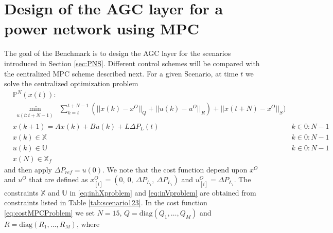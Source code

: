 \documentclass[a4paper]{article}
\newcommand{\subss}[2]{#1_{[#2]}}
\newcommand{\diag}{\mbox{diag}}
\newcommand{\Xset}{\mathbb{X}}
\newcommand{\Uset}{\mathbb{U}}
\newcommand{\norme}[2]{{||{#1}||_{#2}}}
\newcommand{\Pset}{\mathbb{P}}
\begin{document}
     \section{Design of the AGC layer for a power network using MPC}
          The goal of the Benchmark is to design the AGC layer for the scenarios introduced in Section \ref{sec:PNS}. Different control schemes will be compared with the centralized MPC scheme described next. For a given Scenario, at time $t$ we solve the centralized optimization problem
          \begin{subequations}   
            \label{eq:MPCProblem}
            \begin{align}              
              &\Pset^N(x (t)): \\
              &\label{eq:costMPCProblem}\min_{\substack{u(t:t+N-1)}}~\sum_{k=t}^{t+N-1}(\norme{x(k)-x^O}{Q}+\norme{u(k)-u^O}{R})+\norme{x(t+N)-x^O}{S})                                        &                    \\
              &\label{eq:dynproblem}x (k+1)=Ax(k)+Bu(k)+L\Delta P_L(t)                                                                                                                            & k\in0:N-1  \\              
              &\label{eq:inhXproblem}x(k)\in\Xset                                                                                                                                                               & k\in0:N-1  \\
              &\label{eq:inVproblem}u(k)\in\Uset                                                                                                                                                                 & k\in0:N-1  \\
              &\label{eq:inTerminalSet}x(N)\in\Xset_f                                                                                                                                                           &
            \end{align}
          \end{subequations}
          and then apply $\Delta P_{ref} = u(0)$. We note that the cost function depend upon $x^O$ and $u^O$ that are defined as $\subss x i^O=(0,~0,~\Delta P_{L_i},~\Delta P_{L_i})$ and $\subss u i^O=\Delta P_{L_i}$. The constraints $\Xset$ and $\Uset$ in \eqref{eq:inhXproblem} and \eqref{eq:inVproblem} are obtained from constraints listed in Table \ref{tab:scenario123}. In the cost function \eqref{eq:costMPCProblem} we set $N=15$, $Q=\diag(Q_1,\ldots,Q_M)$ and $R=\diag(R_1,\ldots,R_M)$, where
\end{document}
